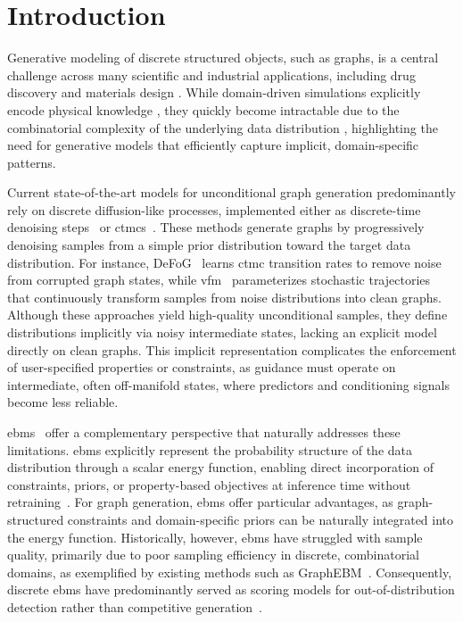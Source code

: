 \section{Introduction}
\label{sec:introduction}

Generative modeling of discrete structured objects, such as graphs, 
is a central challenge across many scientific and industrial applications, 
including drug discovery and materials design \citep{jin2018junction,stokes2020deep,xie2022crystal}.  While domain-driven simulations explicitly encode physical knowledge \citep{noe2020machine}, 
they quickly become intractable due to the combinatorial complexity of the underlying data distribution \citep{polishchuk2013estimation}, 
highlighting the need for generative models that efficiently capture implicit, domain-specific patterns.

Current state-of-the-art models for unconditional graph generation predominantly rely on discrete diffusion-like processes, implemented either as discrete-time denoising steps~\citep{vignac2022digress} or \glspl{ctmc}~\citep{campbell2024generative,qinmadeira2024defog}. These methods generate graphs by progressively denoising samples from a simple prior distribution toward the target data distribution. For instance, DeFoG~\citep{qinmadeira2024defog} learns \gls{ctmc} transition rates to remove noise from corrupted graph states, while \gls{vfm}~\citep{eijkelboom2024vfm, eijkelboom2025controlledvfm} parameterizes stochastic trajectories that continuously transform samples from noise distributions into clean graphs. Although these approaches yield high-quality unconditional samples, they define distributions implicitly via noisy intermediate states, lacking an explicit model directly on clean graphs. This implicit representation complicates the enforcement of user-specified properties or constraints, as guidance must operate on intermediate, often off-manifold states, where predictors and conditioning signals become less reliable.

\Glspl{ebm}~\citep{hinton2002training, lecun2006tutorial, du2019implicit} offer a complementary perspective that naturally addresses these limitations. \Glspl{ebm} explicitly represent the probability structure of the data distribution through a scalar energy function, enabling direct incorporation of constraints, priors, or property-based objectives at inference time without retraining~\citep{du2025learning}. For graph generation, \glspl{ebm} offer particular advantages, as graph-structured constraints and domain-specific priors can be naturally integrated into the energy function. Historically, however, \glspl{ebm} have struggled with sample quality, primarily due to poor sampling efficiency in discrete, combinatorial domains, as exemplified by existing methods such as GraphEBM~\citep{liu2021graphebm}. Consequently, discrete \glspl{ebm} have predominantly served as scoring models for out-of-distribution detection rather than competitive generation~\citep{wu2023energy,fuchsgruber2024energy}.




